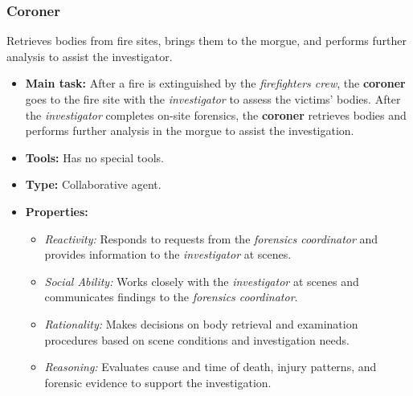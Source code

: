 \subsubsection{Coroner}
Retrieves bodies from fire sites, brings them to the morgue, and performs further analysis to assist the investigator.
\begin{itemize}
    \item \textbf{Main task:} After a fire is extinguished by the \textit{firefighters crew}, the \textbf{coroner} goes to the fire site with the \textit{investigator} to assess the victims' bodies. After the \textit{investigator} completes on-site forensics, the \textbf{coroner} retrieves bodies and performs further analysis in the morgue to assist the investigation.
    \item \textbf{Tools:} Has no special tools.
    \item \textbf{Type:} Collaborative agent.
    \item \textbf{Properties:}
    \begin{itemize}
        \item \textit{Reactivity:} Responds to requests from the \textit{forensics coordinator} and provides information to the \textit{investigator} at scenes.
        \item \textit{Social Ability:} Works closely with the \textit{investigator} at scenes and communicates findings to the \textit{forensics coordinator}.
        \item \textit{Rationality:} Makes decisions on body retrieval and examination procedures based on scene conditions and investigation needs.
        \item \textit{Reasoning:} Evaluates cause and time of death, injury patterns, and forensic evidence to support the investigation.
    \end{itemize}
\end{itemize}

